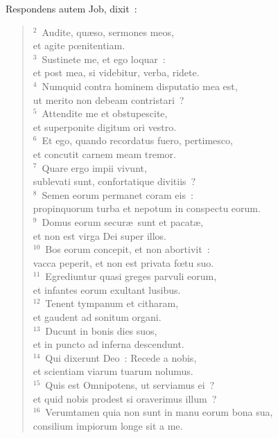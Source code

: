 \lettrine[lines=10,image=true,loversize=0.05,lraise=-0.03]{R}{}espondens autem Job, dixit~:
\begin{flushleft}\begin{verse}\vspace{6pt}${}^{2}$~Audite, qu\ae so, sermones meos,\\ et agite pœnitentiam.\\
${}^{3}$~Sustinete me, et ego loquar~:\\ et post mea, si videbitur, verba, ridete.\\
${}^{4}$~Numquid contra hominem disputatio mea est,\\ ut merito non debeam contristari~?\\
${}^{5}$~Attendite me et obstupescite,\\ et superponite digitum ori vestro.\\
${}^{6}$~Et ego, quando recordatus fuero, pertimesco,\\ et concutit carnem meam tremor.\\
${}^{7}$~Quare ergo impii vivunt,\\ sublevati sunt, confortatique divitiis~?\\
${}^{8}$~Semen eorum permanet coram eis~:\\ propinquorum turba et nepotum in conspectu eorum.\\
${}^{9}$~Domus eorum secur\ae\ sunt et pacat\ae ,\\ et non est virga Dei super illos.\\
${}^{10}$~Bos eorum concepit, et non abortivit~:\\ vacca peperit, et non est privata fœtu suo.\\
${}^{11}$~Egrediuntur quasi greges parvuli eorum,\\ et infantes eorum exultant lusibus.\\
${}^{12}$~Tenent tympanum et citharam,\\ et gaudent ad sonitum organi.\\
${}^{13}$~Ducunt in bonis dies suos,\\ et in puncto ad inferna descendunt.\\
${}^{14}$~Qui dixerunt Deo~: Recede a nobis,\\ et scientiam viarum tuarum nolumus.\\
${}^{15}$~Quis est Omnipotens, ut serviamus ei~?\\ et quid nobis prodest si oraverimus illum~?\\
${}^{16}$~Verumtamen quia non sunt in manu eorum bona sua,\\ consilium impiorum longe sit a me.\\

\end{verse}
\end{flushleft}
